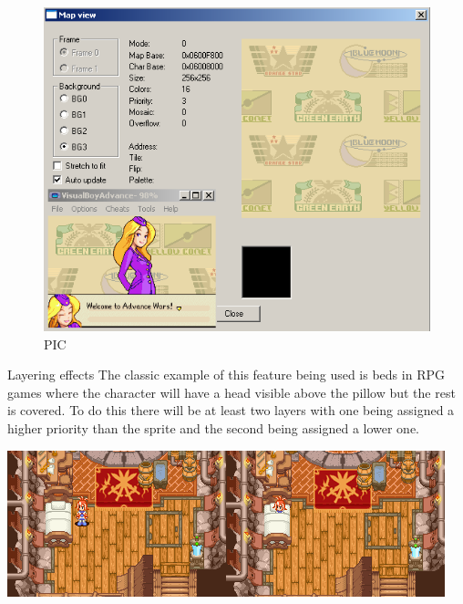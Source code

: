 \documentclass[
]{book}
\begin{document}
\begin{figure}
\centering
\includegraphics{images/36_home_fast6191_romhackingguide_unrenamed_file___inal_borders_romhackingguide2dBGscrolling_2.png}
\caption{PIC}
\end{figure}

Layering effects The classic example of this feature being used is beds in RPG games where the character will have a head visible above the pillow but the rest is covered. To do this there will be at least two layers with one being assigned a higher priority than the sprite and the second being assigned a lower one.

\includegraphics{images/37_home_fast6191_romhackingguide_unrenamed_file___original_borders_romhackingguideBGlayering1.png}\includegraphics{images/38_home_fast6191_romhackingguide_unrenamed_file___original_borders_romhackingguideBGlayering2.png}
\end{document}
